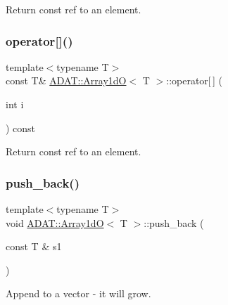 Return const ref to an element. 

\mbox{\label{classADAT_1_1Array1dO_a48b2dbd0a7e4ee5dce18a12ca19d78be}} 
\subsubsection{\texorpdfstring{operator[]()}{operator[]()}\hspace{0.1cm}{\footnotesize\ttfamily [6/6]}}
{\footnotesize\ttfamily template$<$typename T$>$ \\
const T\& \mbox{\hyperlink{classADAT_1_1Array1dO}{A\+D\+A\+T\+::\+Array1dO}}$<$ T $>$\+::operator\mbox{[}$\,$\mbox{]} (\begin{DoxyParamCaption}\item[{int}]{i }\end{DoxyParamCaption}) const\hspace{0.3cm}{\ttfamily [inline]}}



Return const ref to an element. 

\mbox{\label{classADAT_1_1Array1dO_a6e326e7686f842918f3cbda5c6a4b05f}} 
\subsubsection{\texorpdfstring{push\_back()}{push\_back()}\hspace{0.1cm}{\footnotesize\ttfamily [1/3]}}
{\footnotesize\ttfamily template$<$typename T$>$ \\
void \mbox{\hyperlink{classADAT_1_1Array1dO}{A\+D\+A\+T\+::\+Array1dO}}$<$ T $>$\+::push\+\_\+back (\begin{DoxyParamCaption}\item[{const T \&}]{s1 }\end{DoxyParamCaption})\hspace{0.3cm}{\ttfamily [inline]}}



Append to a vector -\/ it will grow. 

\mbox{\label{classADAT_1_1Array1dO_a6e326e7686f842918f3cbda5c6a4b05f}} 
